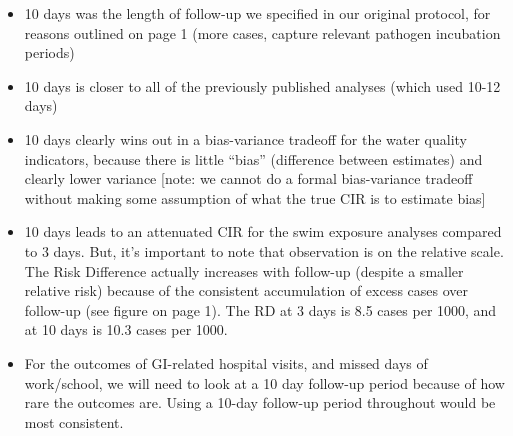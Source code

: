 \documentclass[11pt]{article}
\begin{document}
\begin{itemize}
	\item 10 days was the length of follow-up we specified in our original protocol, for reasons outlined on page 1 (more cases, capture relevant pathogen incubation periods)
	\item 10 days is closer to all of the previously published analyses (which used 10-12 days)
	\item 10 days clearly wins out in a bias-variance tradeoff for the water quality indicators, because there is little ``bias'' (difference between estimates) and clearly lower variance [note: we cannot do a formal bias-variance tradeoff without making some assumption of what the true CIR is to estimate bias]
	\item 10 days leads to an attenuated CIR for the swim exposure analyses compared to 3 days. But, it's important to note that observation is on the relative scale.  The Risk Difference actually increases with follow-up (despite a smaller relative risk) because of the consistent accumulation of excess cases over follow-up (see figure on page 1). The RD at 3 days is 8.5 cases per 1000, and at 10 days is 10.3 cases per 1000.
	\item For the outcomes of GI-related hospital visits, and missed days of work/school, we will need to look at a 10 day follow-up period because of how rare the outcomes are.  Using a 10-day follow-up period throughout would be most consistent.
\end{itemize}
\end{document}
